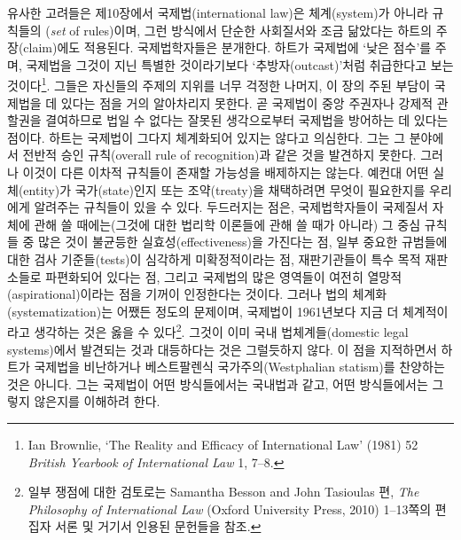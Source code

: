 유사한 고려들은 제10장에서 국제법(international law)은 체계(system)가
아니라 규칙들의 (\emph{set} of rules)이며, 그런 방식에서
단순한 사회질서와 조금 닮았다는 하트의 주장(claim)에도 적용된다.
국제법학자들은 분개한다. 하트가 국제법에 ‘낮은 점수’를 주며, 국제법을
그것이 지닌 특별한 것이라기보다 ‘추방자(outcast)’처럼 취급한다고 보는
것이다\footnote{Ian Brownlie, `The Reality and Efficacy of International
  Law' (1981) 52 \emph{British Yearbook of International Law} 1, 7--8.}.
그들은 자신들의 주제의 지위를 너무 걱정한 나머지, 이 장의 주된 부담이
국제법을  데 있다는 점을 거의 알아차리지 못한다.
곧 국제법이 중앙 주권자나 강제적 관할권을 결여하므로 법일 수 없다는
잘못된 생각으로부터 국제법을 방어하는 데 있다는 점이다. 하트는 국제법이
그다지 체계화되어 있지는 않다고 의심한다. 그는 그 분야에서 전반적 승인
규칙(overall rule of recognition)과 같은 것을 발견하지 못한다. 그러나
이것이 다른 이차적 규칙들이 존재할 가능성을 배제하지는 않는다. 예컨대
어떤 실체(entity)가 국가(state)인지 또는 조약(treaty)을 채택하려면
무엇이 필요한지를 우리에게 알려주는 규칙들이 있을 수 있다. 두드러지는
점은, 국제법학자들이 국제질서 자체에 관해 쓸 때에는(그것에 대한 법리학
이론들에 관해 쓸 때가 아니라) 그 중심 규칙들 중 많은 것이 불균등한
실효성(effectiveness)을 가진다는 점, 일부 중요한 규범들에 대한 검사
기준들(tests)이 심각하게 미확정적이라는 점, 재판기관들이 특수 목적
재판소들로 파편화되어 있다는 점, 그리고 국제법의 많은 영역들이 여전히
열망적(aspirational)이라는 점을 기꺼이 인정한다는 것이다. 그러나 법의
체계화(systematization)는 어쨌든 정도의 문제이며, 국제법이 1961년보다
지금 더 체계적이라고 생각하는 것은 옳을 수 있다\footnote{일부 쟁점에
  대한 검토로는 Samantha Besson and John Tasioulas 편, \emph{The
  Philosophy of International Law} (Oxford University Press, 2010)
  1--13쪽의 편집자 서론 및 거기서 인용된 문헌들을 참조.}. 그것이 이미
국내 법체계들(domestic legal systems)에서 발견되는 것과 대등하다는 것은
그럴듯하지 않다. 이 점을 지적하면서 하트가 국제법을 비난하거나
베스트팔렌식 국가주의(Westphalian statism)를 찬양하는 것은 아니다. 그는
국제법이 어떤 방식들에서는 국내법과 같고, 어떤 방식들에서는 그렇지
않은지를 이해하려 한다.

